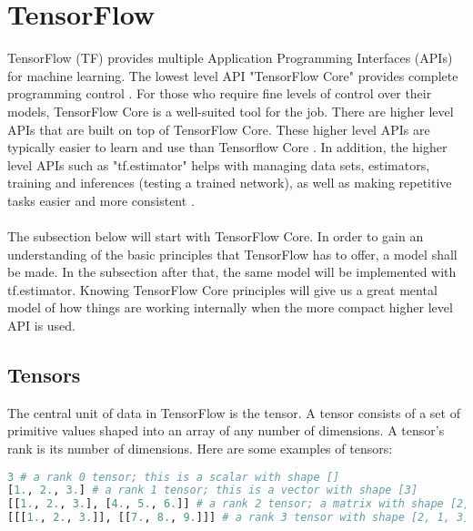 \section{TensorFlow}
TensorFlow (TF) provides multiple Application Programming Interfaces
(APIs) for machine learning. 
The lowest level API "TensorFlow Core" provides complete programming control \cite{tensorflow2015-whitepaper}. 
For those who require fine levels of control over their models,
TensorFlow Core is a well-suited tool for the job. There are higher level APIs that are built on top of TensorFlow Core.
These higher level APIs are typically easier to learn and use than Tensorflow Core \cite{tensorflow2015-whitepaper}.
In addition, the higher level APIs such as "tf.estimator" helps with managing data sets, estimators,
training and inferences (testing a trained network),
as well as making repetitive tasks easier and more consistent
\cite{tensorflow2015-whitepaper}.\\\\
The subsection below will start with TensorFlow Core. 
In order to gain an understanding of the basic principles that TensorFlow has to offer, a model shall be made. 
In the subsection after that, the same model will be implemented with tf.estimator. 
Knowing TensorFlow Core principles will give us a great mental model of how things are working internally when the more compact higher level API is used.

\subsection{Tensors}
The central unit of data in TensorFlow is the tensor. 
A tensor consists of a set of primitive values shaped into an array of any number of dimensions. 
A tensor's rank is its number of dimensions. 
Here are some examples of tensors:
\begin{lstlisting}[language=Python, flexiblecolumns=true, caption=Tensor examples.]
3 # a rank 0 tensor; this is a scalar with shape []
[1., 2., 3.] # a rank 1 tensor; this is a vector with shape [3]
[[1., 2., 3.], [4., 5., 6.]] # a rank 2 tensor; a matrix with shape [2, 3]
[[[1., 2., 3.]], [[7., 8., 9.]]] # a rank 3 tensor with shape [2, 1, 3]
\end{lstlisting}

